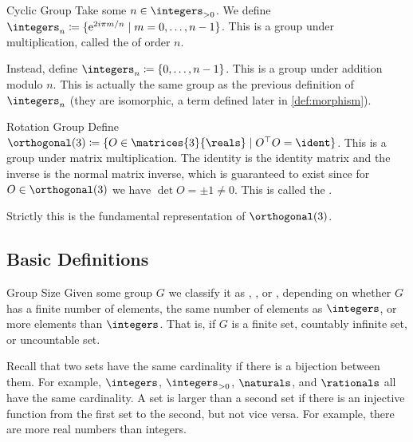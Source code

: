 \begin{exm}{Cyclic Group}{}
    Take some \(n \in \positiveintegers\).
    We define \(\integers_n \coloneqq \{\e^{2i\pi m/n} \mid m = 0, \dotsc, n - 1\}\).
    This is a group under multiplication, called the  of order \(n\).
    
    Instead, define \(\integers_n \coloneqq \{0, \dotsc, n - 1\}\).
    This is a group under addition modulo \(n\).
    This is actually the same group as the previous definition of \(\integers_n\) (they are isomorphic, a term defined later in \cref{def:morphism}).
\end{exm}

\begin{exm}{Rotation Group}{}
    Define \(\orthogonal(3) \coloneqq \{ O \in \matrices{3}{\reals} \mid  O^\trans O = \ident\}\).
    This is a group under matrix multiplication.
    The identity is the identity matrix and the inverse is the normal matrix inverse, which is guaranteed to exist since for \(O \in \orthogonal(3)\) we have \(\det O = \pm 1 \ne 0\).
    This is called the .
    
    \begin{rmk}
        Strictly this is the fundamental representation of \(\orthogonal(3)\).
    \end{rmk}
\end{exm}

\subsection{Basic Definitions}
\begin{dfn}{Group Size}{}
    Given some group \(G\) we classify it as , , or , depending on whether \(G\) has a finite number of elements, the same number of elements as \(\integers\), or more elements than \(\integers\).
    That is, if \(G\) is a finite set, countably infinite set, or uncountable set.
\end{dfn}

Recall that two sets have the same cardinality if there is a bijection between them.
For example, \(\integers\), \(\positiveintegers\), \(\naturals\), and \(\rationals\) all have the same cardinality.
A set is larger than a second set if there is an injective function from the first set to the second, but not vice versa.
For example, there are more real numbers than integers.

